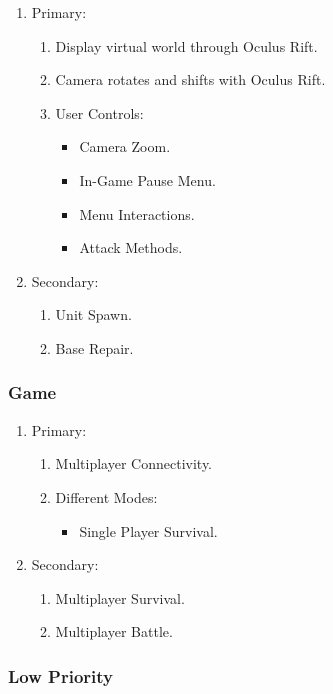 \begin{enumerate}
	\item Primary:
	\begin{enumerate}
		\item Display virtual world through Oculus Rift.
		\item Camera rotates and shifts with Oculus Rift.
		\item User Controls:
		\begin{itemize}
			\item Camera Zoom.
			\item In-Game Pause Menu.
			\item Menu Interactions.
			\item Attack Methods.
		\end{itemize}
	\end{enumerate}
	\item Secondary:
	\begin{enumerate}
		\item Unit Spawn.
		\item Base Repair.
	\end{enumerate}
\end{enumerate}

\subsubsection{Game}

\begin{enumerate}
	\item Primary:
	\begin{enumerate}
		\item Multiplayer Connectivity.
		\item Different Modes:
		\begin{itemize}
			\item Single Player Survival.
		\end{itemize}
	\end{enumerate}
	\item Secondary:
	\begin{enumerate}
		\item Multiplayer Survival.
		\item Multiplayer Battle.
	\end{enumerate}
\end{enumerate}

\subsubsection{Low Priority}

